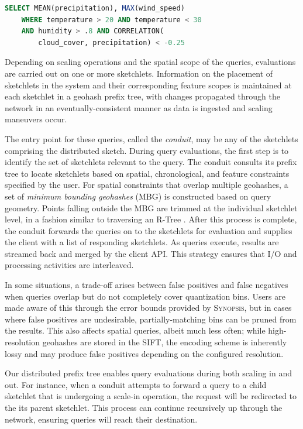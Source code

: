 \documentclass[9pt,journal,compsoc]{IEEEtran}
\begin{document}
\begin{lstlisting}[language=SQL,style=custompy]
    SELECT MEAN(precipitation), MAX(wind_speed)
    WHERE temperature > 20 AND temperature < 30
    AND humidity > .8 AND CORRELATION(
        cloud_cover, precipitation) < -0.25
\end{lstlisting}

Depending on scaling operations and the spatial scope of the queries, evaluations are carried out on one or more sketchlets. Information on the placement of sketchlets in the system and their corresponding feature scopes is maintained at each sketchlet in a geohash prefix tree, with changes propagated through the network in an eventually-consistent manner as data is ingested and scaling maneuvers occur.

The entry point for these queries, called the \emph{conduit}, may be any of the sketchlets comprising the distributed sketch. During query evaluations, the first step is to identify the set of sketchlets relevant to the query. The conduit consults its prefix tree to locate sketchlets based on spatial, chronological, and feature constraints specified by the user. For spatial constraints that overlap multiple geohashes, a set of \emph{minimum bounding geohashes} (MBG) is constructed based on query geometry. Points falling outside the MBG are trimmed at the individual sketchlet level, in a fashion similar to traversing an R-Tree \cite{guttman1984r}.  After this process is complete, the conduit forwards the queries on to the sketchlets for evaluation and supplies the client with a list of responding sketchlets.  As queries execute, results are streamed back and merged by the client API. This strategy ensures that I/O and processing activities are interleaved.

In some situations, a trade-off arises between false positives and false negatives when queries overlap but do not completely cover quantization bins. Users are made aware of this through the error bounds provided by \textsc{Synopsis}, but in cases where false positives are undesirable, partially-matching bins can be pruned from the results. This also affects spatial queries, albeit much less often; while high-resolution geohashes are stored in the SIFT, the encoding scheme is inherently lossy and may produce false positives depending on the configured resolution.

Our distributed prefix tree enables query evaluations during both scaling in and out. For instance, when a conduit attempts to forward a query to a child sketchlet that is undergoing a scale-in operation, the request will be redirected to the its parent sketchlet. This process can continue recursively up through the network, ensuring queries will reach their destination.
\end{document}
